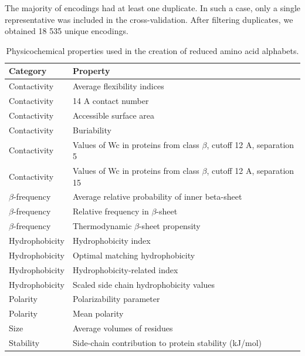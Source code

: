 \documentclass[a4,center,fleqn]{NAR}
\begin{document}
  The majority of encodings had at least one duplicate. In such a case, only a 
single representative was included in the cross-validation. After filtering 
duplicates, we obtained 18 535 unique encodings.
\begin{table}[bth]
\begin{tabularx}{\columnwidth}{@{} lX @{}}
  \toprule
  Category & Property \\ 
  \midrule
  Contactivity & Average flexibility indices \citep{bhaskaran_positional_1988} \\ 
  Contactivity & 14 A contact number \citep{nishikawa_radial_1986} \\ 
  Contactivity & Accessible surface area \citep{radzicka_comparing_1988} \\ 
  Contactivity & Buriability \citep{zhou_quantifying_2004} \\ 
  Contactivity & Values of Wc in proteins from class $\beta$, \newline  cutoff 12 A, separation 5 \citep{wozniak_characteristics_2014} \\ 
  Contactivity & Values of Wc in proteins from class $\beta$, \newline  cutoff 12 A, separation 15 \citep{wozniak_characteristics_2014} \\ 
  $\beta$-frequency & Average relative probability of inner \newline beta-sheet \citep{kanehisa_local_1980} \\ 
  $\beta$-frequency & Relative frequency in $\beta$-sheet \citep{prabhakaran_distribution_1990} \\ 
  $\beta$-frequency & Thermodynamic $\beta$-sheet propensity \citep{kim_thermodynamic_1993} \\ 
  Hydrophobicity & Hydrophobicity index \citep{argos_structural_1982} \\ 
  Hydrophobicity & Optimal matching hydrophobicity \citep{sweet_correlation_1983} \\ 
  Hydrophobicity & Hydrophobicity-related index \citep{kidera_statistical_1985} \\ 
  Hydrophobicity & Scaled side chain hydrophobicity values \citep{black_development_1991} \\ 
  Polarity & Polarizability parameter \citep{charton_structural_1982} \\ 
  Polarity & Mean polarity \citep{radzicka_comparing_1988} \\ 
  Size & Average volumes of residues \citep{pontius_deviations_1996} \\ 
  Stability & Side-chain contribution to protein stability (kJ/mol) \citep{takano_new_2001} \\
  \bottomrule
\end{tabularx}
\caption{Physicochemical properties used in the creation of reduced amino acid 
alphabets.} 
\label{tab:properties}
\end{table}
\end{document}
